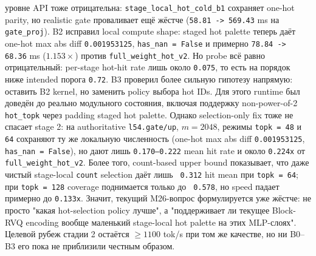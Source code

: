 \begin{itemize}[leftmargin=1.5em]
уровне API тоже отрицательна: \texttt{stage\_local\_hot\_cold\_b1} сохраняет
one-hot parity, но realistic gate проваливает ещё жёстче
(\texttt{58.81 -> 569.43} ms на \texttt{gate\_proj}). B2 исправил local
compute shape: staged hot palette теперь даёт one-hot max abs diff
\texttt{0.001953125}, \texttt{has\_nan = False} и примерно
\texttt{78.84 -> 68.36} ms ($1.153\times$) против
\texttt{full\_weight\_hot\_v2}. Но probe всё равно отрицательный: per-stage
hot-hit rate лишь около \texttt{0.075}, то есть на порядок ниже intended
порога \texttt{0.72}. B3 проверил более сильную гипотезу напрямую: оставить B2
kernel, но заменить policy выбора hot IDs. Для этого runtime был доведён до
реально модульного состояния, включая поддержку non-power-of-2
\texttt{hot\_topk} через padding staged hot palette. Однако selection-only fix
тоже не спасает stage 2: на authoritative \texttt{l54.gate/up}, $m = 2048$,
режимы \texttt{topk = 48} и \texttt{64} сохраняют ту же локальную численность
(one-hot max abs diff \texttt{0.001953125}, \texttt{has\_nan = False}), но дают
лишь \texttt{0.170--0.222} mean hit rate и около \texttt{0.224x} от
\texttt{full\_weight\_hot\_v2}. Более того, count-based upper bound показывает,
что даже чистый stage-local \texttt{count} selection даёт лишь
\texttt{~0.312} hit mean при \texttt{topk = 64}; при \texttt{topk = 128}
coverage поднимается только до \texttt{~0.578}, но speed падает примерно до
\texttt{0.133x}. Значит, текущий M26-вопрос формулируется уже жёстче: не просто
"какая hot-selection policy лучше", а "поддерживает ли текущее Block-RVQ
encoding вообще маленький stage-local hot palette на этих MLP-слоях". Целевой
рубеж стадии 2 остаётся $\ge 1100$ tok/s при том же качестве, но ни B0--B3 его
пока не приблизили честным образом.


\end{itemize}
